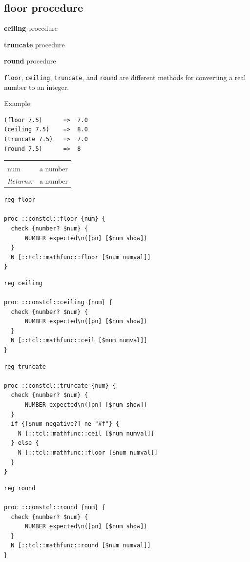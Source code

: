 \documentclass[twoside,9pt]{report}
\begin{document}
\subsection{floor procedure}
\label{floor-procedure}


\textbf{ceiling} procedure


\textbf{truncate} procedure


\textbf{round} procedure


\texttt{floor}, \texttt{ceiling}, \texttt{truncate}, and \texttt{round} are different methods for converting a real number to an integer.



Example:

\begin{verbatim}
(floor 7.5)      =>  7.0
(ceiling 7.5)    =>  8.0
(truncate 7.5)   =>  7.0
(round 7.5)      =>  8
\end{verbatim}
\noindent\begin{tabular}{ |p{1.5cm} p{8cm}| }
\hline
\rowcolor[HTML]{CCCCCC} \multicolumn{2}{|l|}{\bf floor, ceiling, truncate, round (public)} \\
num & a number \\
\textit{Returns:} & a number \\
\hline
\end{tabular}
\begin{lstlisting}
reg floor
 
proc ::constcl::floor {num} {
  check {number? $num} {
      NUMBER expected\n([pn] [$num show])
  }
  N [::tcl::mathfunc::floor [$num numval]]
}
\end{lstlisting}
\begin{lstlisting}
reg ceiling
 
proc ::constcl::ceiling {num} {
  check {number? $num} {
      NUMBER expected\n([pn] [$num show])
  }
  N [::tcl::mathfunc::ceil [$num numval]]
}
\end{lstlisting}
\begin{lstlisting}
reg truncate
 
proc ::constcl::truncate {num} {
  check {number? $num} {
      NUMBER expected\n([pn] [$num show])
  }
  if {[$num negative?] ne "#f"} {
    N [::tcl::mathfunc::ceil [$num numval]]
  } else {
    N [::tcl::mathfunc::floor [$num numval]]
  }
}
\end{lstlisting}
\begin{lstlisting}
reg round
 
proc ::constcl::round {num} {
  check {number? $num} {
      NUMBER expected\n([pn] [$num show])
  }
  N [::tcl::mathfunc::round [$num numval]]
}
\end{lstlisting}
\end{document}
